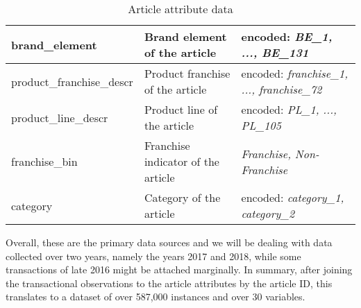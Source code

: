 \begin{table}[H]
\begin{adjustbox}{max width=\textwidth}
\begin{tabular}{|l|l|l|}
brand\_element            & Brand element of the article                           & encoded: \textit{BE\_1, ..., BE\_131 }                   \\ \hline
product\_franchise\_descr & Product franchise of the article                       & encoded: \textit{franchise\_1, ..., franchise\_72}     \\ \hline
product\_line\_descr      & Product line of the article                            & encoded: \textit{PL\_1, ..., PL\_105 }                 \\ \hline
franchise\_bin            & Franchise indicator of the article                     &\textit{Franchise, Non-Franchise }                     \\ \hline
category                  & Category of the article                                & encoded: \textit{category\_1, category\_2}             \\ \hline
\end{tabular}
\end{adjustbox}
\caption{Article attribute data}
\label{tab:article_master_data}
\end{table}

Overall, these are the primary data sources and we will be dealing with data collected over two years, namely the years 2017 and 2018, while some transactions of late 2016 might be attached marginally. In summary, after joining the transactional observations to the article attributes by the article ID, this translates to a dataset of over 587,000 instances and over 30 variables. 

